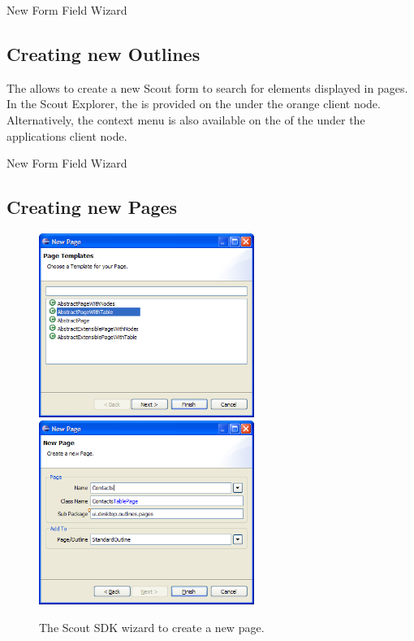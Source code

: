 \documentclass[a4paper,10pt,twoside]{book}
\begin{document}
New Form Field Wizard

\subsection{Creating new Outlines}

The  allows to create a new Scout form to search for elements displayed in pages.  
In the Scout Explorer, the  is provided on the  under the orange client node. 
Alternatively, the context menu is also available on the  of the  under the applications client node. 

New Form Field Wizard

\subsection{Creating new Pages}

\begin{figure}
\includegraphics[width=7cm]{wizard_page_1.png} \hspace{5mm}
\includegraphics[width=7cm]{wizard_page_2.png}
\caption{The Scout SDK wizard to create a new page.}
\end{figure}
\end{document}
